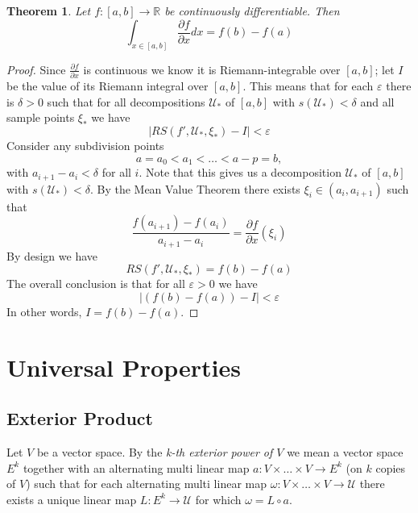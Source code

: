 \documentclass[12pt]{armath}
\newtheorem{theorem}{Theorem}[section]
\newcommand{\U}{\mathcal{U}}
\newcommand{\ra}{\rightarrow}
\newcommand{\R}{\mathbb{R}}
\newcommand{\e}{\varepsilon}
\newcommand{\de}{\delta}
\newcommand{\pder}[2]{\frac{\partial #1}{\partial #2}}
\begin{document}
\begin{theorem}
  Let $f:[a,b]\ra\R$ be continuously differentiable. Then
  \[
    \int_{x\in[a,b]}\pder{f}{x}dx=f(b)-f(a)
  \]
\end{theorem}
\begin{proof}
  Since $\pder{f}{x}$ is continuous we know it is Riemann-integrable over
  $[a,b]$; let $I$ be the value of its Riemann integral over $[a,b]$. This
  means that for each $\e$ there is $\de>0$ such that for all decompositions
  $\U_*$ of $[a,b]$ with $s(\U_*)<\de$ and all sample points $\xi_*$ we have
  \[
    \left|RS(f',\U_*,\xi_*)-I\right|<\e
  \]
  Consider any subdivision points
  \[
    a=a_0<a_1<\ldots<a-p=b,
  \]
  with $a_{i+1}-a_i<\de$ for all $i$. Note that this gives us a decomposition
  $\U_*$ of $[a,b]$ with $s(\U_*)<\de$. By the Mean Value Theorem there exists
  $\xi_i\in(a_i,a_{i+1})$ such that
  \[
    \frac{f(a_{i+1})-f(a_i)}{a_{i+1}-a_i}=\pder{f}{x}(\xi_i)
  \]
  By design we have
  \[
    RS(f',\U_*,\xi_*)=f(b)-f(a)
  \]
  The overall conclusion is that for all $\e>0$ we have
  \[
    |(f(b)-f(a))-I|<\e
  \]
  In other words, $I=f(b)-f(a)$.
\end{proof}

\section{Universal Properties}%
\label{sec:univresal_properties}

\subsection{Exterior Product}%
\label{sub:exterior_product}

\begin{center}
\end{center}

Let $V$ be a vector space. By the \textit{k-th exterior power of $V$} we mean a
vector space $E^k$ together with an alternating multi linear map
$a:V\times\ldots\times V\ra E^k$ (on $k$ copies of $V$) such that for each
alternating multi linear map $\omega:V\times\ldots\times V\ra \U$ there exists a
unique linear map $L:E^k\ra \U$ for which $\omega=L\circ a$.
\end{document}
